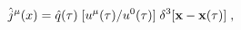 \begin{equation}
\hat j^\mu (x)=
\hat q(\tau)\;[u^\mu (\tau)/u^0 (\tau)] \; \delta^3 [{\bf x}-{\bf x}(\tau)]\;,
\label{CI}
\end{equation}

